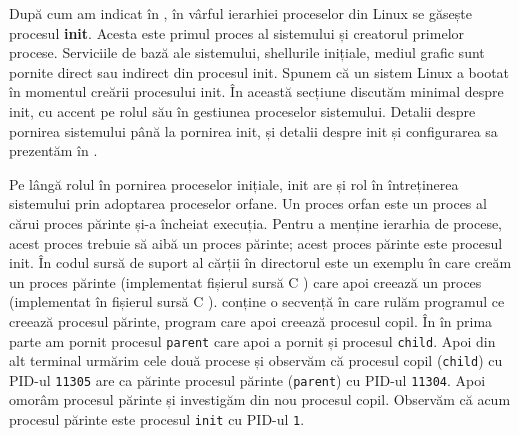 După cum am indicat în ,
în vârful ierarhiei proceselor din Linux se găsește procesul \textbf{init}. Acesta este
primul proces al sistemului și creatorul primelor procese. Serviciile de bază
ale sistemului, shellurile inițiale, mediul grafic sunt pornite direct sau
indirect din procesul init. Spunem că un sistem Linux a bootat în momentul
creării procesului init. În această secțiune discutăm minimal despre init, cu
accent pe rolul său în gestiunea proceselor sistemului. Detalii despre pornirea
sistemului până la pornirea init, și detalii despre init și configurarea sa
prezentăm în .

Pe lângă rolul în pornirea proceselor inițiale, init are și rol în întreținerea
sistemului prin adoptarea proceselor orfane. Un proces orfan este un proces al
cărui proces părinte și-a încheiat execuția. Pentru a menține ierarhia de
procese, acest proces trebuie să aibă un proces părinte; acest proces părinte
este procesul init. În codul sursă de suport al cărții în directorul  este un exemplu în care creăm un proces părinte (implementat fișierul sursă C ) care apoi creează un proces (implementat în fișierul sursă C ).  conține o secvență în care rulăm programul ce creează procesul părinte, program care apoi creează procesul copil.
În  în prima parte am pornit procesul \texttt{parent} care apoi a pornit și procesul \texttt{child}. Apoi din alt terminal urmărim cele două procese și observăm că procesul copil (\texttt{child}) cu PID-ul \texttt{11305} are ca părinte procesul părinte (\texttt{parent}) cu PID-ul \texttt{11304}. Apoi omorâm procesul părinte și investigăm din nou procesul copil. Observăm că acum procesul părinte este procesul \texttt{init} cu PID-ul \texttt{1}.


